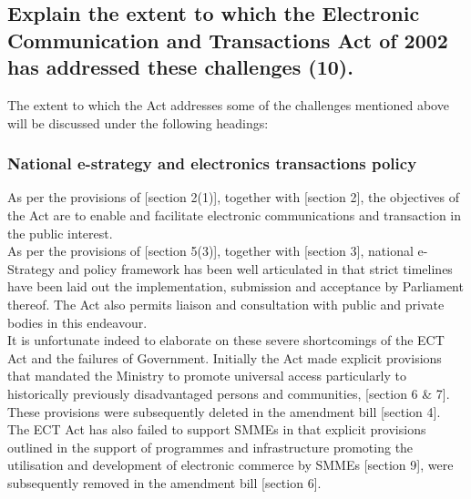 \documentclass[11pt]{article}
\begin{document}
\subsection{Explain the extent to which the Electronic Communication and Transactions Act of 2002 has addressed these challenges (10).}
\label{sec:orgb624b9b}

The extent to which the Act addresses some of the challenges mentioned above will be
discussed under the following headings:

\subsubsection{National e-strategy and electronics transactions policy}
\label{sec:orgf5adf67}

As per the provisions of [section 2(1)]\cite{rsa02_elect_comm_trans_act}, together
with [section 2]\cite{rsa12_elect_comm_trans_amend_bill}, the objectives of the
Act are to enable and facilitate electronic communications and transaction in
the public interest.\\

As per the provisions of [section 5(3)]\cite{rsa02_elect_comm_trans_act}, together
with [section 3]\cite{rsa12_elect_comm_trans_amend_bill}, national e-Strategy and
policy framework has been well articulated in that strict timelines have been laid out the
implementation, submission and acceptance by Parliament thereof. The Act also
permits liaison and consultation with public and private bodies in this
endeavour.\\

It is unfortunate indeed to elaborate on these severe shortcomings of the ECT
Act \cite{rsa02_elect_comm_trans_act} and the failures of Government. Initially
the Act made explicit provisions that mandated the Ministry to promote universal
access particularly to historically previously disadvantaged persons and
communities, [section 6 \& 7]\cite{rsa02_elect_comm_trans_act}. These provisions
were subsequently deleted in the amendment bill [section
4]\cite{rsa12_elect_comm_trans_amend_bill}.\\

The ECT Act \cite{rsa02_elect_comm_trans_act} has also failed to support SMMEs in
that explicit provisions outlined in the support of programmes and
infrastructure promoting the utilisation and development of electronic commerce
by SMMEs [section 9]\cite{rsa02_elect_comm_trans_act}, were subsequently removed
in the amendment bill [section 6]\cite{rsa12_elect_comm_trans_amend_bill}.
\end{document}

